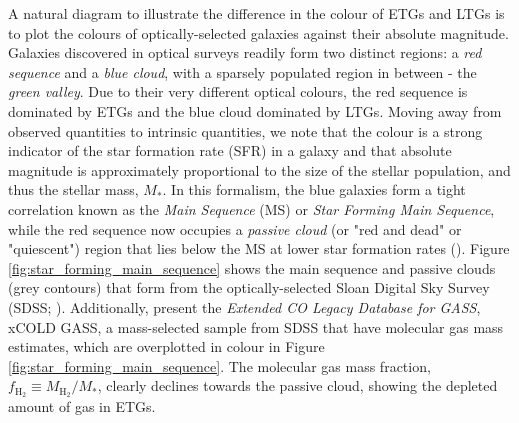 A natural diagram to illustrate the difference in the colour of ETGs and LTGs is to plot the colours of optically-selected galaxies against their absolute magnitude. Galaxies discovered in optical surveys readily form two distinct regions: a \textit{red sequence} and a \textit{blue cloud}, with a sparsely populated region in between - the \textit{green valley}. Due to their very different optical colours, the red sequence is dominated by ETGs and the blue cloud dominated by LTGs. Moving away from observed quantities to intrinsic quantities, we note that the colour is a strong indicator of the star formation rate (SFR) in a galaxy and that absolute magnitude is approximately proportional to the size of the stellar population, and thus the stellar mass, $M_*$. In this formalism, the blue galaxies form a tight correlation known as the \textit{Main Sequence} (MS) or \textit{Star Forming Main Sequence}, while the red sequence now occupies a \textit{passive cloud} (or "red and dead" or "quiescent") region that lies below the MS at lower star formation rates (\citealt{Noeske_2007, Daddi_2007, Elbaz_2007, Rodighiero_2011}). Figure \ref{fig:star_forming_main_sequence} shows the main sequence and passive clouds (grey contours) that form from the optically-selected Sloan Digital Sky Survey (SDSS; \citealt{York_2000}). Additionally, \citealt{Saintonge_2017} present the \textit{Extended CO Legacy Database for GASS}, xCOLD GASS, a mass-selected sample from SDSS that have molecular gas mass estimates, which are overplotted in colour in Figure \ref{fig:star_forming_main_sequence}. The molecular gas mass fraction, $f_{\textrm{H}_2} \equiv M_{\textrm{H}_2}/M_*$, clearly declines towards the passive cloud, showing the depleted amount of gas in ETGs.

